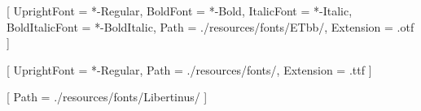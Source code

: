 




\setmainfont{ETbb}[
  UprightFont = {*-Regular},
  BoldFont = {*-Bold},
  ItalicFont = {*-Italic},
  BoldItalicFont = {*-BoldItalic},
  Path = {./resources/fonts/ETbb/},
  Extension = {.otf}
]

\setsansfont{SourceSansPro}[
  UprightFont = {*-Regular},
  Path = {./resources/fonts/},
  Extension = {.ttf}
]


\usepackage{amsmath}
\usepackage{unicode-math}
[
  Path = {./resources/fonts/Libertinus/}
]


\renewcommand{\partformat}{\thepart}

\newcommand*\partgeometry[1]
  {\newgeometry{marginparwidth=0cm,marginparsep=0cm,showframe,inner=0cm,outer=0cm}}
\let\originalpartheademptypage\partheademptypage
\renewcommand\partheademptypage
  {\originalpartheademptypage\restoregeometry}

